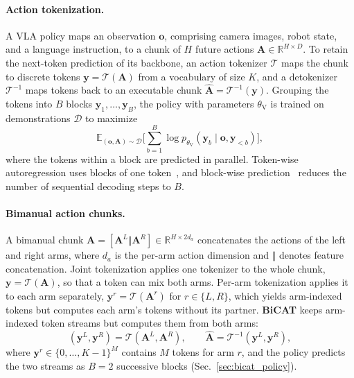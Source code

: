 \paragraph{Action tokenization.}
A VLA policy maps an observation $\mathbf{o}$, comprising camera images,
robot state, and a language instruction, to a chunk of $H$ future actions
$\mathbf{A}\in\mathbb{R}^{H\times D}$. To retain the next-token prediction
of its backbone, an action tokenizer $\mathcal{T}$ maps the chunk to discrete
tokens $\mathbf{y}=\mathcal{T}(\mathbf{A})$ from a vocabulary of size $K$,
and a detokenizer $\mathcal{T}^{-1}$ maps tokens back to an executable chunk
$\widehat{\mathbf{A}}=\mathcal{T}^{-1}(\mathbf{y})$. Grouping the tokens into
$B$ blocks $\mathbf{y}_{1},\ldots,\mathbf{y}_{B}$, the policy with
parameters $\theta_{\mathrm{V}}$ is trained on demonstrations $\mathcal{D}$
to maximize
\begin{equation}
    \mathbb{E}_{(\mathbf{o},\mathbf{A})\sim\mathcal{D}}
    \Big[\sum_{b=1}^{B}\log p_{\theta_{\mathrm{V}}}
    (\mathbf{y}_{b}\mid\mathbf{o},\mathbf{y}_{<b})\Big],
    \label{eq:ar_objective}
\end{equation}
where the tokens within a block are predicted in parallel. Token-wise
autoregression uses blocks of one token~\cite{kim2024openvla,pertsch2025fast},
and block-wise prediction~\cite{stern2018blockwise,liu2026oat_rss,jawaid2026nac,dong2026actioncodec,liu2026faster}
reduces the number of sequential decoding steps to $B$.

\paragraph{Bimanual action chunks.}
A bimanual chunk $\mathbf{A}=[\mathbf{A}^{L}\Vert\mathbf{A}^{R}]
\in\mathbb{R}^{H\times 2d_a}$ concatenates the actions of the left and right
arms, where $d_a$ is the per-arm action dimension and $\Vert$ denotes feature
concatenation. Joint tokenization applies one tokenizer to the whole chunk,
$\mathbf{y}=\mathcal{T}(\mathbf{A})$, so that a token can mix both arms.
Per-arm tokenization applies it to each arm separately,
$\mathbf{y}^{r}=\mathcal{T}(\mathbf{A}^{r})$ for $r\in\{L,R\}$, which yields
arm-indexed tokens but computes each arm's tokens without its partner. \textbf{BiCAT}
keeps arm-indexed token streams but computes them from both arms:
\begin{equation}
    (\mathbf{y}^{L},\mathbf{y}^{R})=\mathcal{T}(\mathbf{A}^{L},\mathbf{A}^{R}),
    \qquad
    \widehat{\mathbf{A}}=\mathcal{T}^{-1}
    (\mathbf{y}^{L},\mathbf{y}^{R}),
    \label{eq:bicat_mapping}
\end{equation}
where $\mathbf{y}^{r}\in\{0,\ldots,K-1\}^{M}$ contains $M$ tokens for arm
$r$, and the policy predicts the two streams as $B=2$ successive blocks
(Sec.~\ref{sec:bicat_policy}).

